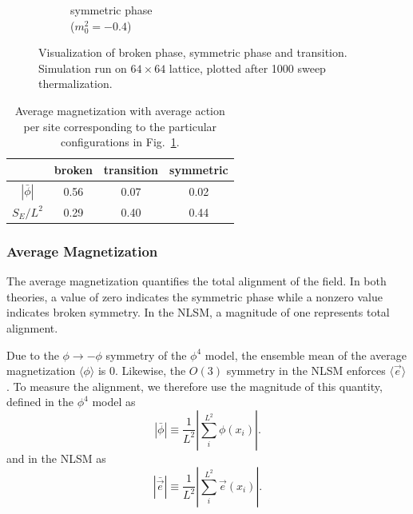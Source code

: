 \documentclass[12pt]{report}
\newcommand{\e}{\vec e}
\begin{document}
\begin{figure}[h]
\begin{center}
\begin{subfigure}[b]{0.3\textwidth}
        \caption{symmetric phase \\($m_0^2=-0.4$)}
      \end{subfigure}
      \hfill
      \caption{\label{fig:primary observables} Visualization of broken phase, symmetric phase and transition. Simulation run on $64\times64$ lattice, plotted after 1000 sweep thermalization.}
  \end{center}
\end{figure}

\begin{table}[h]
    \begin{center}
    {\renewcommand{\arraystretch}{1.2} %
    \begin{tabular}{ c|| c | c | c}
        & broken & transition & symmetric \\ \hline
        $|\bar\phi|$ & 0.56 & 0.07 & 0.02 \\ 
        $S_E/L^2$ & 0.29 & 0.40 & 0.44
    \end{tabular}}

    \end{center}
    \caption{\label{tab:primary observables} Average magnetization with average action per site corresponding to the particular configurations in Fig.~\ref{fig:primary observables}.}
\end{table}

\subsubsection{Average Magnetization}
\label{sec:avg mag}
The average magnetization quantifies the total alignment of the field. In both theories, a value of zero indicates the symmetric phase while a nonzero value indicates broken symmetry. In the NLSM, a magnitude of one represents total alignment.

Due to the $\phi\rightarrow-\phi$ symmetry of the $\phi^4$ model, the ensemble mean of the average magnetization $\langle \phi \rangle$ is $0$. Likewise, the $O(3)$ symmetry in the NLSM enforces $\langle \e \rangle$. To measure the alignment, we therefore use the magnitude of this quantity, defined in the $\phi^4$ model as 
\begin{equation}
|\bar\phi| \equiv \frac{1}{L^2}\left| \sum_i^{L^2} \phi(x_i)\right|.
\end{equation}
and in the NLSM as
\begin{equation}
    |\bar\e| \equiv \frac{1}{L^2}\left|\sum_i^{L^2} \e(x_i)\right|.
\end{equation}
\end{document}
